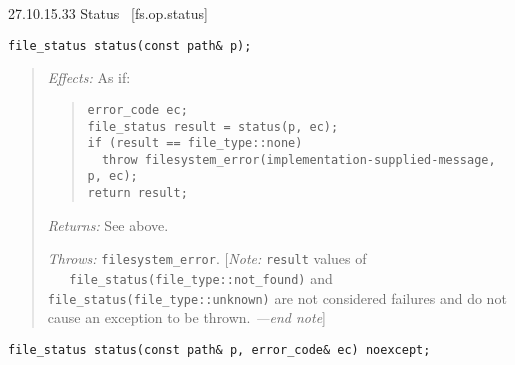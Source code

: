 27.10.15.33 Status~ {[}fs.op.status{]}

\begin{verbatim}
file_status status(const path& p);
\end{verbatim}

\begin{quote}
\emph{Effects:} As if:

\begin{quote}
\begin{verbatim}
error_code ec;
file_status result = status(p, ec);
if (result == file_type::none)
  throw filesystem_error(implementation-supplied-message, p, ec);
return result;
\end{verbatim}
\end{quote}

\emph{Returns:} See above.

\emph{Throws:} \texttt{filesystem\_error}. {[}\emph{Note:}
\texttt{result} values of
\texttt{\ \ \ file\_status(file\_type::not\_found)} and
\texttt{file\_status(file\_type::unknown)} are not considered failures
and do not cause an exception to be thrown. \emph{---end note}{]}
\end{quote}

\begin{verbatim}
file_status status(const path& p, error_code& ec) noexcept;
\end{verbatim}

